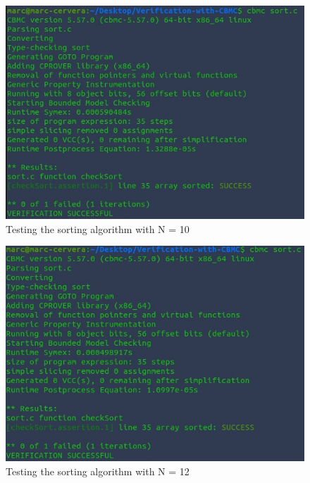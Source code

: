 \documentclass[a4paper,12pt]{article}
\begin{document}
\begin{figure}[H]
    \centering
    \includegraphics{images/testN10.jpg}
    \caption{Testing the sorting algorithm with N = 10}
    \label{fig:bubble10}
\end{figure}


\begin{figure}[H]
    \centering
    \includegraphics{images/testN12.jpg}
    \caption{Testing the sorting algorithm with N = 12}
    \label{fig:bubble12}
\end{figure}


\end{document}
